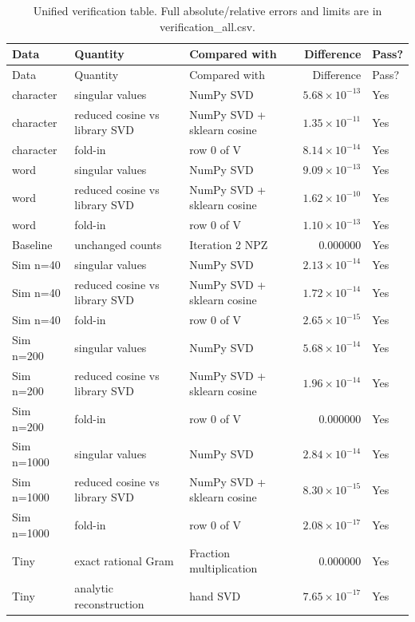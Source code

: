 {\small\renewcommand{\arraystretch}{1.05}
\begin{longtable}{p{}p{}p{}rl}
\caption{Unified verification table. Full absolute/relative errors and limits are in verification\_all.csv.}\\
\toprule
Data & Quantity & Compared with & Difference & Pass? \\ \midrule\endfirsthead
\toprule
Data & Quantity & Compared with & Difference & Pass? \\ \midrule\endhead
character & singular values & NumPy SVD & $5.68\times10^{-13}$ & Yes \\
character & reduced cosine vs library SVD & NumPy SVD + sklearn cosine & $1.35\times10^{-11}$ & Yes \\
character & fold-in & row 0 of V & $8.14\times10^{-14}$ & Yes \\
word & singular values & NumPy SVD & $9.09\times10^{-13}$ & Yes \\
word & reduced cosine vs library SVD & NumPy SVD + sklearn cosine & $1.62\times10^{-10}$ & Yes \\
word & fold-in & row 0 of V & $1.10\times10^{-13}$ & Yes \\
Baseline & unchanged counts & Iteration 2 NPZ & 0.000000 & Yes \\
Sim n=40 & singular values & NumPy SVD & $2.13\times10^{-14}$ & Yes \\
Sim n=40 & reduced cosine vs library SVD & NumPy SVD + sklearn cosine & $1.72\times10^{-14}$ & Yes \\
Sim n=40 & fold-in & row 0 of V & $2.65\times10^{-15}$ & Yes \\
Sim n=200 & singular values & NumPy SVD & $5.68\times10^{-14}$ & Yes \\
Sim n=200 & reduced cosine vs library SVD & NumPy SVD + sklearn cosine & $1.96\times10^{-14}$ & Yes \\
Sim n=200 & fold-in & row 0 of V & 0.000000 & Yes \\
Sim n=1000 & singular values & NumPy SVD & $2.84\times10^{-14}$ & Yes \\
Sim n=1000 & reduced cosine vs library SVD & NumPy SVD + sklearn cosine & $8.30\times10^{-15}$ & Yes \\
Sim n=1000 & fold-in & row 0 of V & $2.08\times10^{-17}$ & Yes \\
Tiny & exact rational Gram & Fraction multiplication & 0.000000 & Yes \\
Tiny & analytic reconstruction & hand SVD & $7.65\times10^{-17}$ & Yes \\

\end{longtable}}
